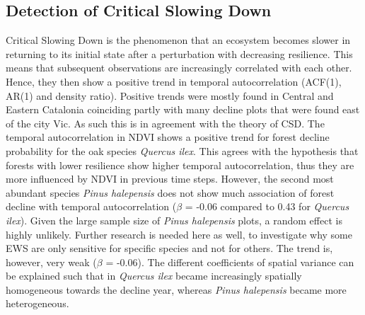 \subsection{Detection of Critical Slowing Down}
Critical Slowing Down is the phenomenon that an ecosystem becomes slower in returning to its initial state after a perturbation with decreasing resilience. This means that subsequent observations are increasingly correlated with each other. Hence, they then show a positive trend in temporal autocorrelation (ACF(1), AR(1) and density ratio). Positive trends were mostly found in Central and Eastern Catalonia coinciding partly with many decline plots that were found east of the city Vic. As such this is in agreement with the theory of CSD. The temporal autocorrelation in NDVI shows a positive trend for forest decline probability for the oak species \textit{Quercus ilex}. This agrees with the hypothesis that forests with lower resilience show higher temporal autocorrelation, thus they are more influenced by NDVI in previous time steps. However, the second most abundant species \textit{Pinus halepensis} does not show much association of forest decline with temporal autocorrelation ($\beta$ = -0.06 compared to 0.43 for \textit{Quercus ilex}). Given the large sample size of \textit{Pinus halepensis} plots, a random effect is highly unlikely. Further research is needed here as well, to investigate why some EWS are only sensitive for specific species and not for others. The trend is, however, very weak ($\beta$ = -0.06). The different coefficients of spatial variance can be explained such that in \textit{Quercus ilex} became increasingly spatially homogeneous towards the decline year, whereas \textit{Pinus halepensis} became more heterogeneous.\\


